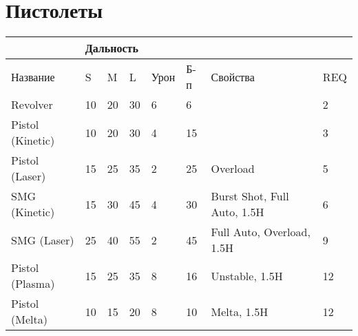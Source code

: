         \section*{Пистолеты}
        \begin{table}[H]
            \centering
            \begin{tabular}{|l|lll|l|l|l|l|}
            \hline
                             & \multicolumn{3}{l|}{Дальность}                         &      &     &                             &     \\ \hline
            Название         & \multicolumn{1}{l|}{S}  & \multicolumn{1}{l|}{M}  & L  & Урон & Б-п & Свойства                    & REQ \\ \hline
            Revolver         & \multicolumn{1}{l|}{10} & \multicolumn{1}{l|}{20} & 30 & 6    & 6   &                             & 2   \\ \hline
            Pistol (Kinetic) & \multicolumn{1}{l|}{10} & \multicolumn{1}{l|}{20} & 30 & 4    & 15  &                             & 3   \\ \hline
            Pistol (Laser)   & \multicolumn{1}{l|}{15} & \multicolumn{1}{l|}{25} & 35 & 2    & 25  & Overload                    & 5   \\ \hline
            SMG (Kinetic)    & \multicolumn{1}{l|}{15} & \multicolumn{1}{l|}{30} & 45 & 4    & 30  & Burst Shot, Full Auto, 1.5H & 6   \\ \hline
            SMG (Laser)      & \multicolumn{1}{l|}{25} & \multicolumn{1}{l|}{40} & 55 & 2    & 45  & Full Auto, Overload, 1.5H   & 9   \\ \hline
            Pistol (Plasma)  & \multicolumn{1}{l|}{15} & \multicolumn{1}{l|}{25} & 35 & 8    & 16  & Unstable, 1.5H              & 12  \\ \hline
            Pistol (Melta)   & \multicolumn{1}{l|}{10} & \multicolumn{1}{l|}{15} & 20 & 8    & 10  & Melta, 1.5H                 & 12  \\ \hline
            \end{tabular}
            \end{table}

